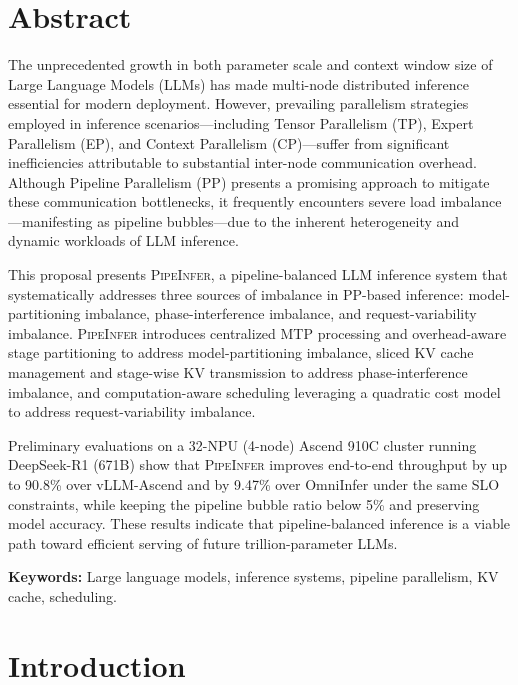 \documentclass[12pt,a4paper]{article}
\newcommand{\sys}{\textsc{PipeInfer}\xspace}
\newcommand{\modelimb}{model-partitioning imbalance\xspace}
\newcommand{\phaseimb}{phase-interference imbalance\xspace}
\newcommand{\requestimb}{request-variability imbalance\xspace}
\newcommand{\centralmtp}{centralized MTP processing\xspace}
\newcommand{\overheadpartition}{overhead-aware stage partitioning\xspace}
\newcommand{\slicedkv}{sliced KV cache management\xspace}
\newcommand{\stagekv}{stage-wise KV transmission\xspace}
\newcommand{\timesched}{computation-aware scheduling\xspace}
\newcommand{\clusterconfig}{32-NPU (4-node) Ascend 910C cluster\xspace}
\newcommand{\vllmgain}{90.8\%\xspace}
\newcommand{\omnigain}{9.47\%\xspace}
\newcommand{\bubblecap}{5\%\xspace}
\begin{document}
\hypersetup{pageanchor=true}
\pagestyle{frontmatter}

\section*{Abstract}

The unprecedented growth in both parameter scale and context window size of Large Language Models (LLMs) has made multi-node distributed inference essential for modern deployment.
However, prevailing parallelism strategies employed in inference scenarios---including Tensor Parallelism (TP), Expert Parallelism (EP), and Context Parallelism (CP)---suffer from significant inefficiencies attributable to substantial inter-node communication overhead.
Although Pipeline Parallelism (PP) presents a promising approach to mitigate these communication bottlenecks, it frequently encounters severe load imbalance---manifesting as pipeline bubbles---due to the inherent heterogeneity and dynamic workloads of LLM inference.

This proposal presents \sys, a pipeline-balanced LLM inference system that systematically addresses three sources of imbalance in PP-based inference: \modelimb, \phaseimb, and \requestimb.
\sys introduces \centralmtp and \overheadpartition to address \modelimb, \slicedkv and \stagekv to address \phaseimb, and \timesched leveraging a quadratic cost model to address \requestimb.

Preliminary evaluations on a \clusterconfig running DeepSeek-R1 (671B) show that \sys improves end-to-end throughput by up to \vllmgain over vLLM-Ascend and by \omnigain over OmniInfer under the same SLO constraints, while keeping the pipeline bubble ratio below \bubblecap and preserving model accuracy.
These results indicate that pipeline-balanced inference is a viable path toward efficient serving of future trillion-parameter LLMs.

\vspace{0.8cm}
\noindent \textbf{Keywords:} Large language models, inference systems, pipeline parallelism, KV cache, scheduling.

\newpage
\tableofcontents
\newpage
{}
\pagestyle{proposal}

\section{Introduction}
\end{document}
